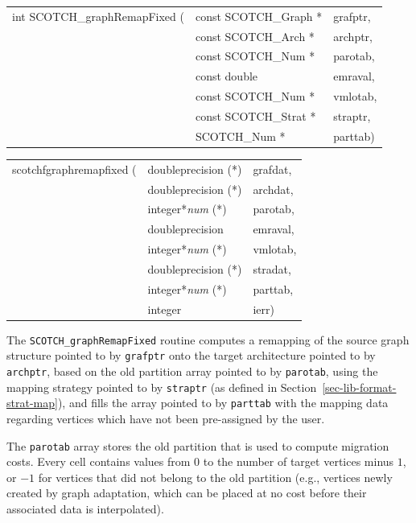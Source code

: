 \begin{itemize}
\progsyn

{\tt\begin{tabular}{l@{}ll}
int SCOTCH\_graphRemapFixed ( & const SCOTCH\_Graph * & grafptr, \\
                              & const SCOTCH\_Arch *  & archptr, \\
                              & const SCOTCH\_Num *   & parotab, \\
                              & const double          & emraval, \\
                              & const SCOTCH\_Num *   & vmlotab, \\
                              & const SCOTCH\_Strat * & straptr, \\
                              & SCOTCH\_Num *         & parttab)
\end{tabular}}

{\tt\begin{tabular}{l@{}ll}
scotchfgraphremapfixed ( & doubleprecision (*)   & grafdat, \\
                         & doubleprecision (*)   & archdat, \\
                         & integer*{\it num} (*) & parotab, \\
                         & doubleprecision       & emraval, \\
                         & integer*{\it num} (*) & vmlotab, \\
                         & doubleprecision (*)   & stradat, \\
                         & integer*{\it num} (*) & parttab, \\
                         & integer               & ierr)
\end{tabular}}

\progdes

The {\tt SCOTCH\_graphRemapFixed} routine computes a remapping of the
source graph structure pointed to by {\tt grafptr} onto the target
architecture pointed to by {\tt archptr}, based on the old partition
array pointed to by {\tt parotab}, using the mapping strategy pointed
to by {\tt straptr} (as defined in Section~\ref{sec-lib-format-strat-map}),
and fills the array pointed to by {\tt parttab} with the mapping data
regarding vertices which have not been pre-assigned by the user.

The {\tt parotab} array stores the old partition that is used to
compute migration costs. Every cell contains values from $0$ to the
number of target vertices minus $1$, or $-1$ for vertices that did not
belong to the old partition (e.g., vertices newly created by graph
adaptation, which can be placed at no cost before their associated
data is interpolated).


\end{itemize}
